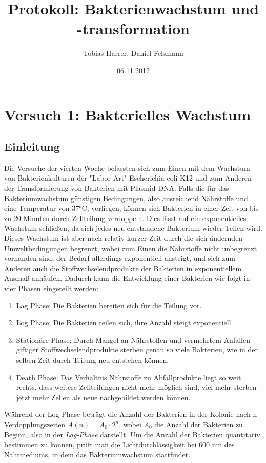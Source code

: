 \documentclass[12pt,twoside]{article}
\begin{document}
\author{Tobias Harrer, Daniel Felsmann}
\title{Protokoll: Bakterienwachstum und -transformation}
\date{06.11.2012}
\maketitle
\tableofcontents
\newpage 
\section{Versuch 1: Bakterielles Wachstum}
\subsection{Einleitung}
Die Versuche der vierten Woche befassten sich zum Einen mit dem Wachstum von Bakterienkulturen der "Labor-Art" Escherichia coli K12 und zum Anderen der Transformierung von Bakterien mit Plasmid DNA. Falls die für das Bakteriumwachstum günstigen Bedingungen, also ausreichend Nährstoffe und eine Temperatur von 37°C, vorliegen, können sich Bakterien in einer Zeit von bis zu 20 Minuten durch Zellteilung verdoppeln. Dies lässt auf ein exponentielles Wachstum schließen, da sich jedes neu entstandene Bakterium wieder Teilen wird. Dieses Wachstum ist aber nach relativ kurzer Zeit durch die sich ändernden Umweltbedingungen begrenzt, wobei zum Einen die Nährstoffe nicht unbegrenzt vorhanden sind, der Bedarf allerdings exponentiell ansteigt, und sich zum Anderen auch die Stoffwechselendprodukte der Bakterien in exponentiellem Ausmaß anhäufen. Dadurch kann die Entwicklung einer Bakterien wie folgt in vier Phasen eingeteilt werden:
\begin{enumerate}
\item Lag Phase: Die Bakterien bereiten sich für die Teilung vor.
\item Log Phase: Die Bakterien teilen sich, ihre Anzahl steigt exponentiell.
\item Stationäre Phase: Durch Mangel an Nährstoffen und vermehrtem Anfallen giftiger Stoffwechselendprodukte sterben genau so viele Bakterien, wie in der selben Zeit durch Teilung neu entstehen können.
\item Death Phase: Das Verhältnis Nährstoffe zu Abfallprodukte liegt so weit rechts, dass weitere Zellteilungen nicht mehr möglich sind, viel mehr sterben jetzt mehr Zellen als neue nachgebildet werden können.
\end{enumerate}
Während der Log-Phase beträgt die Anzahl der Bakterien in der Kolonie nach n Verdopplungszeiten $A(n) = A_0 \cdot 2^{n}$, wobei $A_0$ die Anzahl der Bakterien zu Beginn, also in der \textit{Lag-Phase} darstellt. \newline
Um die Anzahl der Bakterien quantitativ bestimmen zu können, prüft man die Lichtdurchlässigkeit bei 600 nm des Nährmediums, in dem das Bakteriumwachstum stattfindet.
\end{document}
